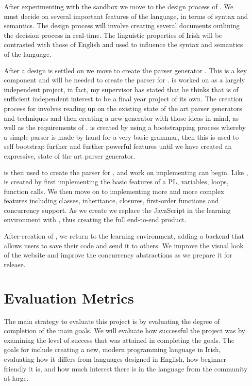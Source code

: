 After experimenting with the sandbox we move to the design process of \Setanta{}. We must decide on several important features of the language, in terms of syntax and semantics. The design process will involve creating several documents outlining the decision process in real-time. The linguistic properties of Irish will be contrasted with those of English and used to influence the syntax and semantics of the language.

After a design is settled on we move to create the parser generator \tsPEG{}. This is a key component and will be needed to create the parser for \Setanta{}. \tsPEG{} is worked on as a largely independent project, in fact, my supervisor has stated that he thinks that \tsPEG{} is of sufficient independent interest to be a final year project of its own. The creation process for \tsPEG{} involves reading up on the existing state of the art parser generators and techniques and then creating a new generator with those ideas in mind, as well as the requirements of \Setanta{}. \tsPEG{} is created by using a bootstrapping process whereby a simple parser is made by hand for a very basic grammar, then this is used to self bootstrap further and further powerful features until we have created an expressive, state of the art parser generator.

\tsPEG{} is then used to create the parser for \Setanta{}, and work on implementing \Setanta{} can begin. Like \tsPEG{}, \Setanta{} is created by first implementing the basic features of a PL, variables, loops, function calls. We then move on to implementing more and more complex features including classes, inheritance, closures, first-order functions and concurrency support. As we create \Setanta{} we replace the JavaScript in the learning environment with \Setanta{}, thus creating the full end-to-end product.

After-creation of \Setanta{}, we return to the learning environment, adding a backend that allows users to save their code and send it to others. We improve the visual look of the website and improve the concurrency abstractions as we prepare it for release.

\section{Evaluation Metrics}

The main strategy to evaluate this project is by evaluating the degree of completion of the main goals. We will evaluate how successful the project was by examining the level of success that was attained in completing the goals. The goals for \Setanta{} include creating a new, modern programming language in Irish, evaluating how it differs from languages designed in English, how beginner-friendly it is, and how much interest there is in the language from the community at large.

